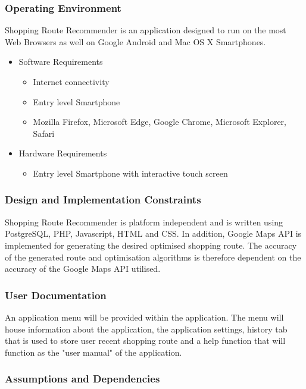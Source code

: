 \documentclass[10pt,twocolumn]{witseiepaper}
\begin{document}
		\subsubsection{Operating Environment}
		
		Shopping Route Recommender is an application designed to run on the most Web Browsers as well on Google Android and Mac OS X Smartphones. 
		
		\begin{itemize}
			\item Software Requirements
			\begin{itemize}
				\item Internet connectivity
				\item Entry level Smartphone
				\item Mozilla Firefox, Microsoft Edge, Google Chrome, Microsoft Explorer, Safari
			\end{itemize}
			\item Hardware Requirements
			\begin{itemize}
				\item Entry level Smartphone with interactive touch screen
			\end{itemize}
		\end{itemize}
		
		\subsubsection{Design and Implementation Constraints} 
		
		Shopping Route Recommender is platform independent and is written using PostgreSQL, PHP, Javascript, HTML and CSS. In addition, Google Maps API is implemented for generating the desired optimised shopping route. The accuracy of the generated route and optimisation algorithms is therefore dependent on the accuracy of the Google Maps API utilised. 
		
		\subsubsection{User Documentation}
		
		An application menu will be provided within the application. The menu will house information about the application, the application settings, history tab that is used to store user recent shopping route and a help function that will function as the "user manual" of the application. 
		
		\subsubsection{Assumptions and Dependencies}
		
\end{document}

